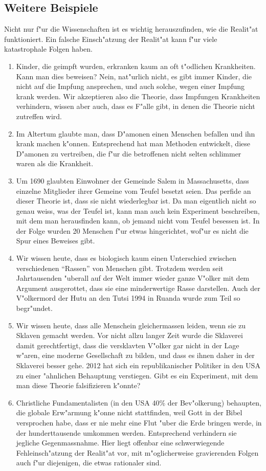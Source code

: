 \subsection*{Weitere Beispiele}
Nicht nur f"ur die Wissenschaften ist es wichtig herauszufinden,
wie die Realit"at funktioniert.
Ein falsche Einsch"atzung der Realit"at kann f"ur viele katastrophale
Folgen haben.
\begin{enumerate}
\item Kinder, die geimpft wurden, erkranken kaum an oft t"odlichen
Krankheiten. Kann man dies beweisen? Nein, nat"urlich nicht, es gibt
immer Kinder, die nicht auf die Impfung ansprechen, und auch solche,
wegen einer Impfung krank werden. Wir akzeptieren also die Theorie,
dass Impfungen Krankheiten verhindern, wissen aber auch, dass es
F"alle gibt, in denen die Theorie nicht zutreffen wird.
\item Im Altertum glaubte man, dass D"amonen einen Menschen
befallen und ihn krank machen k"onnen. Entsprechend hat man Methoden
entwickelt, diese D"amonen zu vertreiben, die f"ur die betroffenen
nicht selten schlimmer waren als die Krankheit.
\item Um 1690 glaubten Einwohner der Gemeinde Salem in Massachusetts,
dass einzelne Mitglieder ihrer Gemeine vom Teufel besetzt seien.
Das perfide an dieser Theorie ist, dass sie nicht wiederlegbar ist.
Da man eigentlich nicht so genau weiss, was der Teufel ist, kann man
auch kein Experiment beschreiben, mit dem man herausfinden kann, ob
jemand nicht vom Teufel besessen ist. In der Folge wurden 20 Menschen
f"ur etwas hingerichtet, wof"ur es nicht die Spur eines Beweises gibt.
\item Wir wissen heute, dass es biologisch kaum einen Unterschied
zwischen verschiedenen ``Rassen'' von Menschen gibt.
Trotzdem werden seit Jahrtausenden "uberall auf der Welt immer wieder
ganze V"olker mit dem Argument ausgerottet, dass sie eine minderwertige
Rasse darstellen. Auch der V"olkermord der Hutu an den Tutsi 1994 in Ruanda
wurde zum Teil so begr"undet.
\item Wir wissen heute, dass alle Menschein gleichermassen leiden,
wenn sie zu Sklaven gemacht werden.
Vor nicht allzu langer Zeit wurde die Sklaverei damit gerechtfertigt,
dass die versklavten V"olker gar nicht in der Lage w"aren, eine moderne
Gesellschaft zu bilden, und dass es ihnen daher in der Sklaverei besser
gehe. 2012 hat sich ein republikanischer Politiker in den USA
zu einer "ahnlichen Behauptung verstiegen. Gibt es ein Experiment, mit dem
man diese Theorie falsifizieren k"onnte?
\item Christliche Fundamentalisten (in den USA 40\% der Bev"olkerung)
behaupten, die globale Erw"armung k"onne
nicht stattfinden, weil Gott in der Bibel versprochen habe, dass er
nie mehr eine Flut "uber die Erde bringen werde, in der hunderttausende
umkommen werden.
Entsprechend verhindern sie jegliche Gegenmassnahme.
Hier liegt offenbar eine schwerwiegende Fehleinsch"atzung der
Realit"at vor, mit m"oglicherweise gravierenden Folgen auch f"ur
diejenigen, die etwas rationaler sind.
\end{enumerate}


